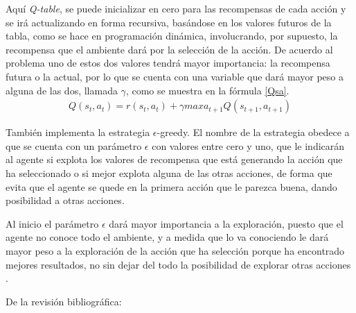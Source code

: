 Aquí \textit{Q-table}, se puede inicializar en cero para las recompensas de cada acción y se irá actualizando en forma recursiva, basándose en los valores futuros de la tabla, como se hace en programación dinámica, involucrando, por supuesto, la recompensa que el ambiente dará por la selección de la acción. De acuerdo al problema uno de estos dos valores tendrá mayor importancia: la recompensa futura o la actual, por lo que se cuenta con una variable que dará mayor peso a alguna de las dos, llamada $\gamma$, como se muestra en la fórmula \ref{Qsa}.
\begin{eqnarray}\label{Qsa} 
Q(s_t, a_t) = r(s_t, a_t) + \gamma max a_{t+1} Q(s_{t+1}, a_{t+1})
\end{eqnarray}

También implementa la estrategia $\epsilon$-greedy. El nombre de la estrategia obedece a que se cuenta con un parámetro $\epsilon$ con valores entre cero y uno, que le indicarán al agente si explota los valores de recompensa que está generando la acción que ha seleccionado o si mejor explota alguna de las otras acciones, de forma que evita que el agente se quede en la primera acción que le parezca buena, dando posibilidad a otras acciones. 

Al inicio el parámetro $\epsilon$ dará mayor importancia a la exploración, puesto que el agente no conoce todo el ambiente, y a medida que lo va conociendo le dará mayor peso a la exploración de la acción que ha selección porque ha encontrado mejores resultados, no sin dejar del todo la posibilidad de explorar otras acciones \cite{bubeck2012regret}.

%
%
De la revisión bibliográfica:

